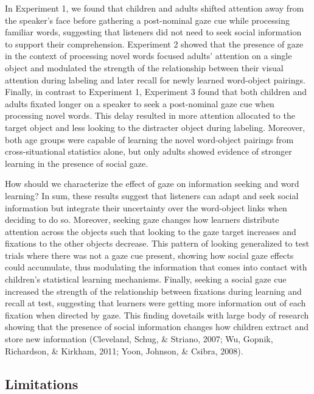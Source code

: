 \documentclass[man,floatsintext]{apa6}
\begin{document}
In Experiment 1, we found that children and adults shifted attention
away from the speaker's face before gathering a post-nominal gaze cue
while processing familiar words, suggesting that listeners did not need
to seek social information to support their comprehension. Experiment 2
showed that the presence of gaze in the context of processing novel
words focused adults' attention on a single object and modulated the
strength of the relationship between their visual attention during
labeling and later recall for newly learned word-object pairings.
Finally, in contrast to Experiment 1, Experiment 3 found that both
children and adults fixated longer on a speaker to seek a post-nominal
gaze cue when processing novel words. This delay resulted in more
attention allocated to the target object and less looking to the
distracter object during labeling. Moreover, both age groups were
capable of learning the novel word-object pairings from
cross-situational statistics alone, but only adults showed evidence of
stronger learning in the presence of social gaze.

How should we characterize the effect of gaze on information seeking and
word learning? In sum, these results suggest that listeners can adapt
and seek social information but integrate their uncertainty over the
word-object links when deciding to do so. Moreover, seeking gaze changes
how learners distribute attention across the objects such that looking
to the gaze target increases and fixations to the other objects
decrease. This pattern of looking generalized to test trials where there
was not a gaze cue present, showing how social gaze effects could
accumulate, thus modulating the information that comes into contact with
children's statistical learning mechanisms. Finally, seeking a social
gaze cue increased the strength of the relationship between fixations
during learning and recall at test, suggesting that learners were
getting more information out of each fixation when directed by gaze.
This finding dovetails with large body of research showing that the
presence of social information changes how children extract and store
new information (Cleveland, Schug, \& Striano, 2007; Wu, Gopnik,
Richardson, \& Kirkham, 2011; Yoon, Johnson, \& Csibra, 2008).

\subsection{Limitations}\label{limitations-1}
\end{document}
